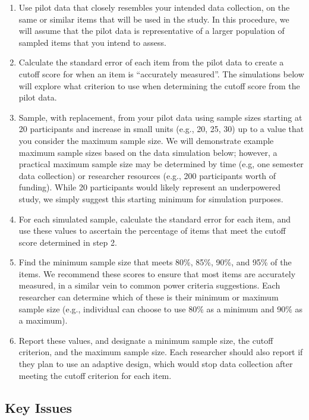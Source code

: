 \documentclass[
  man]{apa6}
\providecommand{\tightlist}{%
  \setlength{\itemsep}{0pt}\setlength{\parskip}{0pt}}
\begin{document}
\begin{enumerate}
\def\labelenumi{\arabic{enumi})}
\tightlist
\item
  Use pilot data that closely resembles your intended data collection, on the same or similar items that will be used in the study. In this procedure, we will assume that the pilot data is representative of a larger population of sampled items that you intend to assess.
\item
  Calculate the standard error of each item from the pilot data to create a cutoff score for when an item is ``accurately measured''. The simulations below will explore what criterion to use when determining the cutoff score from the pilot data.
\item
  Sample, with replacement, from your pilot data using sample sizes starting at 20 participants and increase in small units (e.g., 20, 25, 30) up to a value that you consider the maximum sample size. We will demonstrate example maximum sample sizes based on the data simulation below; however, a practical maximum sample size may be determined by time (e.g, one semester data collection) or researcher resources (e.g., 200 participants worth of funding). While 20 participants would likely represent an underpowered study, we simply suggest this starting minimum for simulation purposes.
\item
  For each simulated sample, calculate the standard error for each item, and use these values to ascertain the percentage of items that meet the cutoff score determined in step 2.
\item
  Find the minimum sample size that meets 80\%, 85\%, 90\%, and 95\% of the items. We recommend these scores to ensure that most items are accurately measured, in a similar vein to common power criteria suggestions. Each researcher can determine which of these is their minimum or maximum sample size (e.g., individual can choose to use 80\% as a minimum and 90\% as a maximum).
\item
  Report these values, and designate a minimum sample size, the cutoff criterion, and the maximum sample size. Each researcher should also report if they plan to use an adaptive design, which would stop data collection after meeting the cutoff criterion for each item.
\end{enumerate}

\hypertarget{key-issues}{%
\subsection{Key Issues}\label{key-issues}}
\end{document}
